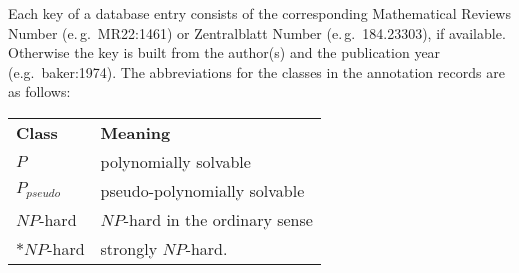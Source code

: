 \documentclass[a4paper,11pt]{article}
\newcommand{\NP}{N\!P}
\begin{document}
 Each key of a database entry consists of the
corresponding Mathematical Reviews Number (e.\,g.\ MR22:1461) or
Zentralblatt Number (e.\,g.\ 184.23303), if available. Otherwise the
key is built from the author(s) and the publication year (e.g.\ 
baker:1974).  The abbreviations for the classes in the annotation
records are as follows:
\begin{center}
  \begin{tabular}{ll}
    \bf Class & \bf Meaning \\[1ex]
    $P$ & polynomially solvable \\
    $P_{pseudo}$ & pseudo-polynomially solvable \\
    $\NP$-hard & $\NP$-hard in the ordinary sense \\
    $*\NP$-hard & strongly $\NP$-hard.
  \end{tabular}
\end{center}

\vspace{5ex}
%


\def\refname{\Large\bf Scheduling Problem Classification\\[1ex]
  \normalsize\rm  (\today)\vspace{3ex}}

\nocite{*}

\end{document}
